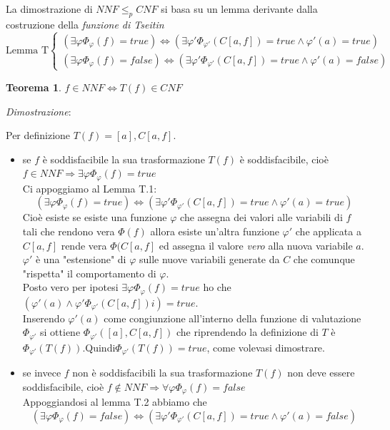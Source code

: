\documentclass[a4paper]{article}
\newtheorem*{theorem}{Teorema}
\newenvironment{dimostrazione}{\textit{Dimostrazione}:\begin{adjustwidth}{1cm}{}}{\end{adjustwidth}}
\newcommand{\red}{\leq_p}
\begin{document}
La dimostrazione di $NNF \red CNF$ si basa su un lemma derivante dalla costruzione della \textit{funzione di Tseitin}
\begin{equation*}
	\text{Lemma T}\begin{cases}
		(\exists \varphi \Phi_\varphi(f) = true) \Leftrightarrow (\exists \varphi' \Phi_{\varphi'}(C[a,f]) = true \land \varphi'(a) = true)\\
		(\exists \varphi \Phi_\varphi(f) = false) \Leftrightarrow (\exists \varphi' \Phi_{\varphi'}(C[a,f]) = true \land \varphi'(a) = false)
	\end{cases}
\end{equation*}
\begin{theorem}
	$f \in NNF \Leftrightarrow T(f) \in CNF$ 
\end{theorem}
\begin{dimostrazione}
	Per definizione $T(f) = [a],C[a,f]$.
	\begin{itemize}
		\item se $f$ è soddisfacibile la sua trasformazione $T(f)$ è soddisfacibile, cioè $f \in NNF \Rightarrow \exists \varphi \Phi_\varphi(f) = true$\\
			Ci appoggiamo al Lemma T.1: 
			$$(\exists \varphi \Phi_\varphi(f) = true) \Leftrightarrow (\exists \varphi' \Phi_{\varphi'}(C[a,f]) = true \land \varphi'(a) = true)$$
			Cioè esiste se esiste una funzione $\varphi$ che assegna dei valori alle variabili di $f$ tali che rendono vera $\Phi(f)$ allora esiste un'altra funzione $\varphi'$ che applicata a $C[a,f]$ rende vera $\Phi(C[a,f]$ ed assegna il valore \textit{vero} alla nuova variabile $a$.$\varphi'$ è una "estensione" di $\varphi$ sulle nuove variabili generate da $C$ che comunque "rispetta" il comportamento di $\varphi$.\\
			Posto vero per ipotesi $\exists \varphi \Phi_\varphi(f)= true$ ho che $(\varphi'(a) \land \varphi' \Phi_{\varphi'}(C[a,f])i)=true$.\\
			Inserendo $\varphi'(a)$ come congiunzione all'interno della funzione di valutazione $\Phi_{\varphi'}$ si ottiene $\Phi_{\varphi'}([a],C[a,f])$ che riprendendo la definizione di $T$ è $\Phi_{\varphi'}(T(f))$.Quindi$\Phi_{\varphi'}(T(f))=true$, come volevasi dimostrare.
		\item se invece $f$ non è soddisfacibili la sua trasformazione $T(f)$ non deve essere soddisfacibile, cioè $f \notin NNF \Rightarrow \forall \varphi \Phi_\varphi(f) = false$\\
			Appoggiandosi al lemma T.2 abbiamo che
			$$(\exists \varphi \Phi_\varphi(f) = false) \Leftrightarrow (\exists \varphi' \Phi_{\varphi'}(C[a,f]) = true \land \varphi'(a) = false)$$

\end{itemize}
\end{dimostrazione}
\end{document}
